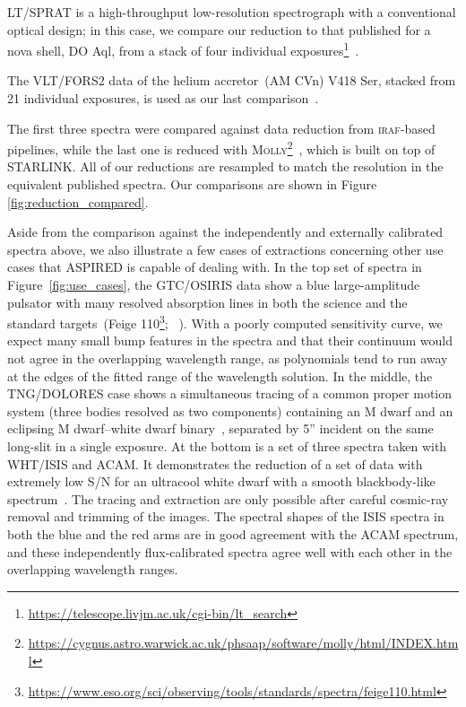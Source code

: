 \documentclass[linenumbers, twocolumn]{aastex631}
\begin{document}
LT/SPRAT is a high-throughput low-resolution spectrograph with
a conventional optical design; in this case, we compare our reduction to that
published for a nova shell, DO Aql, from a stack of four individual 
exposures\footnote{\url{https://telescope.livjm.ac.uk/cgi-bin/lt_search}}~\citep{2020MNRAS.499.2959H}. 

The VLT/FORS2 data
of the helium accretor~(AM CVn) V418 Ser, stacked from 21 individual exposures, is
used as our last comparison~\citep{2020MNRAS.496.1243G}. 

The first three spectra were 
compared against data reduction from \textsc{iraf}-based pipelines, while the
last one is reduced with \textsc{Molly}\footnote{
\url{https://cygnus.astro.warwick.ac.uk/phsaap/software/molly/html/INDEX.html}}~\citep{2019ascl.soft07012M},
which is built on top of \textsc{STARLINK}. All of our reductions are resampled to match
the resolution in the equivalent published spectra. Our comparisons are shown in Figure \ref{fig:reduction_compared}.

Aside from the comparison against the independently and externally calibrated
spectra above, we also illustrate a few cases of extractions concerning
other use cases that \textsc{ASPIRED} is capable of dealing with. In the top set
of spectra in Figure~\ref{fig:use_cases}, the GTC/OSIRIS data show a
blue large-amplitude pulsator with many resolved absorption lines in both the
science and the standard targets~(Feige 110\footnote{
\url{https://www.eso.org/sci/observing/tools/standards/spectra/feige110.html}};
~\citealp{2022MNRAS.511.4971M}). With a poorly computed sensitivity curve, we
expect many small bump features in the spectra and that their continuum would
not agree in the overlapping wavelength range, as polynomials tend to run away
at the edges of the fitted range of the wavelength solution. In the middle,
the TNG/DOLORES case shows a simultaneous tracing of a common proper
motion system (three bodies resolved as two components) containing an M dwarf
and an eclipsing M dwarf--white dwarf binary~\citep{2022MNRAS.509.4171K},
separated by 5'' incident on the same long-slit in a single exposure.
At the bottom is a set of three spectra taken with WHT/ISIS and ACAM.
It demonstrates the reduction of a set of data with extremely low S/N
for an ultracool white dwarf with a smooth blackbody-like
spectrum~\citep{2020MNRAS.493.6001L}. The tracing and extraction are only
possible after careful cosmic-ray removal and trimming of the images. The
spectral shapes of the ISIS spectra in both the blue and the red arms are in good
agreement with the ACAM spectrum, and these independently flux-calibrated
spectra agree well with each other in the overlapping wavelength ranges.
\end{document}
